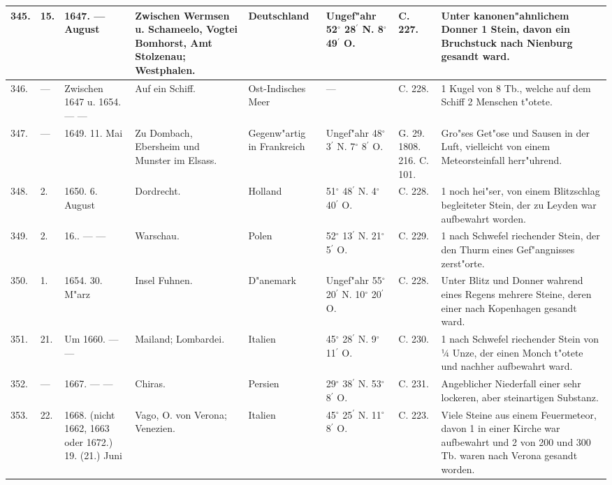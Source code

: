 \documentclass[a4paper, 8pt, oneside, polutonikogreek, german]{article}
\begin{document}
\begin{center}
\begin{longtable}{| p{5mm} | p{3mm} | p{15mm} | p{25mm} | p{20mm} | p{14mm} | p{17mm} | p{24mm} |}
        345. & 15. & 1647. --- August & Zwischen Wermsen u. Schameelo, Vogtei Bomhorst, Amt Stolzenau; Westphalen. & Deutschland & Ungef"ahr 52$^\circ$ 28$^\prime$ N. 8$^\circ$ 49$^\prime$ O. & C. 227. & Unter kanonen"ahnlichem Donner 1 Stein, davon ein Bruchstuck nach Nienburg gesandt ward. \\ \hline
        346. & --- & Zwischen 1647 u. 1654. --- --- & Auf ein Schiff. & Ost-Indisches Meer & --- & C. 228. & 1 Kugel von 8 Tb., welche auf dem Schiff 2 Menschen t"otete. \\ \hline
        347. & --- & 1649. 11. Mai & Zu Dombach, Ebersheim und Munster im Elsass. & Gegenw"artig in Frankreich & Ungef"ahr 48$^\circ$ 3$^\prime$ N. 7$^\circ$ 8$^\prime$ O. & G. 29. 1808. 216. C. 101. & Gro"ses Get"ose und Sausen in der Luft, vielleicht von einem Meteorsteinfall herr"uhrend. \\ \hline
        348. & 2. & 1650. 6. August & Dordrecht. & Holland & 51$^\circ$ 48$^\prime$ N. 4$^\circ$ 40$^\prime$ O. & C. 228. & 1 noch hei"ser, von einem Blitzschlag begleiteter Stein, der zu Leyden war aufbewahrt worden. \\ \hline
        349. & 2. & 16.. --- --- & Warschau. & Polen & 52$^\circ$ 13$^\prime$ N. 21$^\circ$ 5$^\prime$ O. & C. 229. & 1 nach Schwefel riechender Stein, der den Thurm eines Gef"angnisses zerst"orte. \\ \hline
        350. & 1. & 1654. 30. M"arz & Insel Fuhnen. & D"anemark & Ungef"ahr 55$^\circ$ 20$^\prime$ N. 10$^\circ$ 20$^\prime$ O. & C. 228. & Unter Blitz und Donner wahrend eines Regens mehrere Steine, deren einer nach Kopenhagen gesandt ward. \\ \hline
        351. & 21. & Um 1660. --- --- & Mailand; Lombardei. & Italien & 45$^\circ$ 28$^\prime$ N. 9$^\circ$ 11$^\prime$ O. & C. 230. & 1 nach Schwefel riechender Stein von ¼ Unze, der einen Monch t"otete und nachher aufbewahrt ward. \\ \hline
        352. & --- & 1667. --- --- & Chiras. & Persien & 29$^\circ$ 38$^\prime$ N. 53$^\circ$ 8$^\prime$ O. & C. 231. & Angeblicher Niederfall einer sehr lockeren, aber steinartigen Substanz. \\ \hline
        353. & 22. & 1668. (nicht 1662, 1663 oder 1672.) 19. (21.) Juni & Vago, O. von Verona; Venezien. & Italien & 45$^\circ$ 25$^\prime$ N. 11$^\circ$ 8$^\prime$ O. & C. 223. & Viele Steine aus einem Feuermeteor, davon 1 in einer Kirche war aufbewahrt und 2 von 200 und 300 Tb. waren nach Verona gesandt worden. \\ \hline

\end{longtable}
\end{center}
\end{document}
